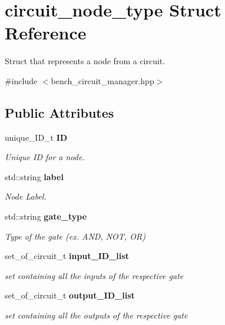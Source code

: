\section{circuit\+\_\+node\+\_\+type Struct Reference}
\label{structcircuit__node__type}


Struct that represents a node from a circuit.  




{\ttfamily \#include $<$bench\+\_\+circuit\+\_\+manager.\+hpp$>$}

\subsection*{Public Attributes}
\begin{DoxyCompactItemize}
\item 
unique\+\_\+\+I\+D\+\_\+t {\bf ID}\label{structcircuit__node__type_afacb1e6847ed44fac3331f71f5ec04b6}

\begin{DoxyCompactList}\small\item\em Unique ID for a node. \end{DoxyCompactList}\item 
std\+::string {\bf label}\label{structcircuit__node__type_af8938c10e6a23cf894a7fa8c7ed1418c}

\begin{DoxyCompactList}\small\item\em Node Label. \end{DoxyCompactList}\item 
std\+::string {\bf gate\+\_\+type}\label{structcircuit__node__type_a6d3b4331c5ad9a248154bfbada6ef9df}

\begin{DoxyCompactList}\small\item\em Type of the gate (ex. A\+ND, N\+OT, OR) \end{DoxyCompactList}\item 
set\+\_\+of\+\_\+circuit\+\_\+t {\bf input\+\_\+\+I\+D\+\_\+list}\label{structcircuit__node__type_a569f94035014dfc750d4070aee13876e}

\begin{DoxyCompactList}\small\item\em set containing all the inputs of the respective gate \end{DoxyCompactList}\item 
set\+\_\+of\+\_\+circuit\+\_\+t {\bf output\+\_\+\+I\+D\+\_\+list}\label{structcircuit__node__type_abeef1f2b534968593864f1193c964660}

\begin{DoxyCompactList}\small\item\em set containing all the outputs of the respective gate \end{DoxyCompactList}\end{DoxyCompactItemize}


